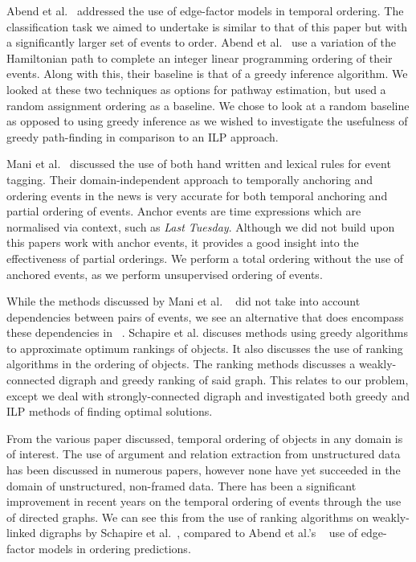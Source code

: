 \documentclass[bsc,frontabs,twoside,singlespacing,parskip,deptreport]{infthesis}     %
\begin{document}
Abend et al.~\cite{abend2015lexical} addressed the use of
edge-factor models in temporal ordering. The classification task we aimed to undertake is similar to that of this paper
but with a significantly larger set of events to order.
Abend et al.~\cite{abend2015lexical} use a variation of the Hamiltonian path
to complete an integer linear programming ordering of their events. Along with this, their baseline is that of a greedy inference algorithm.
We looked at these two techniques as options for pathway estimation, but used a random assignment ordering as
a baseline. We chose to look at a random baseline as opposed to using greedy inference as
we wished to investigate the usefulness of greedy path-finding in comparison to an ILP approach.

Mani et al.~\cite{mani2006machine} discussed the use of both hand written and lexical rules for event tagging.
Their domain-independent approach to temporally anchoring and ordering events in the news is very accurate for both temporal
anchoring and partial ordering of events. Anchor events are time expressions which are normalised via
context, such as \textit{Last Tuesday}. Although we did not build upon this papers work with
anchor events, it provides a good insight into the effectiveness of
partial orderings. We perform a total ordering without the use of anchored events,
as we perform unsupervised ordering of events.

While the methods discussed by Mani et al. ~\cite{mani2006machine} did not take into account dependencies between pairs of events, 
we see an alternative that does encompass
these dependencies in ~\cite{schapire1998learning}.
Schapire et al. discuses methods using greedy algorithms to approximate optimum rankings of objects.
It also discusses the use of ranking algorithms in the ordering of objects. The ranking methods discusses a
weakly-connected digraph and greedy ranking of said graph. This relates to our problem,
except we deal with strongly-connected digraph and investigated both greedy and ILP methods of finding
optimal solutions.


From the various paper discussed, temporal ordering of objects in any domain is of interest.
The use of argument and relation extraction from unstructured data has been discussed in numerous papers,
however none have yet succeeded in the domain of unstructured, non-framed data.
There has been a significant improvement in recent years on the temporal ordering of events through the use of
directed graphs. We can see this from the use of ranking algorithms on weakly-linked
digraphs by Schapire et al.~\cite{schapire1998learning}, compared to Abend et al.'s ~\cite{abend2015lexical} use of edge-factor models in ordering predictions. 
\end{document}
